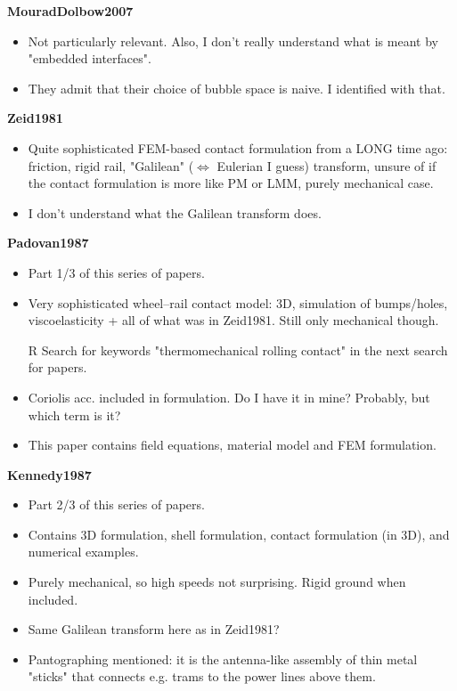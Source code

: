 \documentclass{article}
\begin{document}
\textbf{MouradDolbow2007}
\begin{itemize}
\item Not particularly relevant. Also, I don't really understand what is meant by "embedded interfaces".
\item They admit that their choice of bubble space is naive. I identified with that.
\end{itemize}

\textbf{Zeid1981}
\begin{itemize}
\item Quite sophisticated FEM-based contact formulation from a LONG time ago: friction, rigid rail, "Galilean" ($\Leftrightarrow$ Eulerian I guess) transform, unsure of if the contact formulation is more like PM or LMM, purely mechanical case.
\item I don't understand what the Galilean transform does.
\end{itemize}

\textbf{Padovan1987}
\begin{itemize}
\item Part 1/3 of this series of papers.
\item Very sophisticated wheel--rail contact model: 3D, simulation of bumps/holes, viscoelasticity + all of what was in Zeid1981. Still only mechanical though.
\item[R] Search for keywords "thermomechanical rolling contact" in the next search for papers.
\item Coriolis acc. included in formulation. Do I have it in mine? Probably, but which term is it?
\item This paper contains field equations, material model and FEM formulation.
\end{itemize}

\textbf{Kennedy1987}
\begin{itemize}
\item Part 2/3 of this series of papers.
\item Contains 3D formulation, shell formulation, contact formulation (in 3D), and numerical examples.
\item Purely mechanical, so high speeds not surprising. Rigid ground when included.
\item Same Galilean transform here as in Zeid1981?
\item Pantographing mentioned: it is the antenna-like assembly of thin metal "sticks" that connects e.g. trams to the power lines above them.
\end{itemize}
\end{document}
